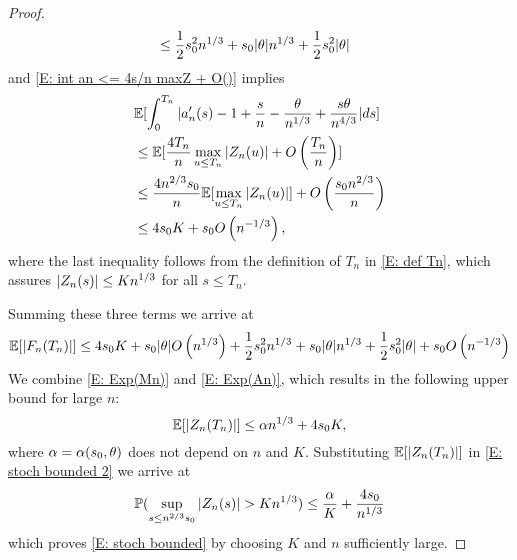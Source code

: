 \begin{proof}
\begin{equation}
\begin{aligned}
	&\leq \frac{1}{2}s_0^2n^{1 / 3} + s_0|\theta|n^{1 / 3} + \frac{1}{2}s_0^2|\theta|
	\end{aligned}
	\end{equation}
	and \eqref{E: int an <= 4s/n maxZ + O()} implies
	\begin{equation}
	\begin{aligned}
	&\mathbb{E}[\int_{0}^{T_n} |a'_n(s) - 1 + \frac{s}{n} - \frac{\theta}{n^{1 / 3}} + \frac{s\theta}{n^{4 / 3}}|ds] \\
	&\leq \mathbb{E}[ \frac{4T_n}{n} \max_{u \leq T_n}|Z_n(u)| + O\left(\frac{T_n}{n}\right) ] \\
	&\leq \frac{4n^{2 / 3}s_0}{n} \mathbb{E}[\max_{u \leq T_n}|Z_n(u)|] + O\left(\frac{s_0n^{2 / 3}}{n}\right) \\
	&\leq 4s_0 K + s_0O\left(n^{-1 / 3}\right),
	\end{aligned}
	\end{equation}
	where the last inequality follows from the definition of $T_n$ in \eqref{E: def Tn},
	which assures $|Z_n(s)| \leq Kn^{1 / 3}$ for all $s \leq T_n$. 
	
	Summing these three terms we arrive at
	\begin{equation} \label{E: Exp(An)}
	\mathbb{E}[|F_n(T_n)|] \leq 4 s_0 K + s_0|\theta|O\left(n^{1 / 3}\right) + \frac{1}{2}s_0^2n^{1 / 3} + s_0|\theta|n^{1 / 3} + \frac{1}{2}s_0^2|\theta| + s_0O\left(n^{-1 / 3}\right)
	\end{equation}
	We combine \eqref{E: Exp(Mn)} and \eqref{E: Exp(An)}, 
	which results in the following upper bound for large $n$:
	\begin{equation} \label{E: bound Zn}
	\mathbb{E}[|Z_n(T_n)|] \leq \alpha n^{1 / 3} + 4s_0K,
	\end{equation}
	where $\alpha = \alpha(s_0,\theta)$ does not depend on $n$ and $K$. 
	Substituting $\mathbb{E}[|Z_n(T_n)|]$ in \eqref{E: stoch bounded 2} we arrive at
	\begin{equation}
	\mathbb{P}( \sup_{s\leq n^{2/3} s_0} |Z_n(s)| > K n^{1 / 3} ) \leq \frac{\alpha}{K} + \frac{4s_0}{n^{1 / 3}}
	\end{equation}
	which proves \eqref{E: stoch bounded} by choosing $K$ and $n$ sufficiently large.
\end{proof}


